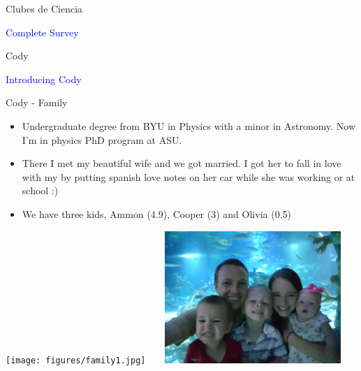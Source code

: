 \documentclass{beamer}
\begin{document}
\begin{frame}{Clubes de Ciencia}
   \begin{center}
      \Huge \textcolor{blue}{Complete Survey}
   \end{center}
\end{frame}

\begin{frame}{Cody}
   \begin{center}
      \Huge \textcolor{blue}{Introducing Cody}
   \end{center}
\end{frame}

\begin{frame}{Cody - Family}
   \begin{itemize}
      \item Undergraduate degree from BYU in Physics with a minor in Astronomy. Now I'm in physics PhD program at ASU.
      \item There I met my beautiful wife and we got married. I got her to fall in love with my by putting spanish love notes on her car while she was working or at school :)
      \item We have three kids, Ammon (4.9), Cooper (3) and Olivia (0.5)
   \end{itemize}
   \begin{center}
      \texttt{[image: figures/family1.jpg]}
      ~ ~
      \includegraphics[width=0.5\textwidth]{figures/family2.jpg}
   \end{center}
\end{frame}
\end{document}
